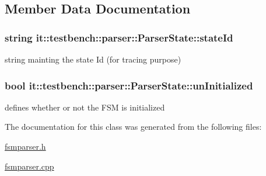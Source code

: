 \subsection{Member Data Documentation}
\hypertarget{classit_1_1testbench_1_1parser_1_1ParserState_a37ff06cea73b93936c08c364ceba28ca}{
\subsubsection[{state\-Id}]{\setlength{\rightskip}{0pt plus 5cm}string it\-::testbench\-::parser\-::\-Parser\-State\-::state\-Id\hspace{0.3cm}{\ttfamily [protected]}}}\label{db/d52/classit_1_1testbench_1_1parser_1_1ParserState_a37ff06cea73b93936c08c364ceba28ca}
string mainting the state Id (for tracing purpose) \hypertarget{classit_1_1testbench_1_1parser_1_1ParserState_a352a009cc8f93cd7a8936b8b806b76df}{
\subsubsection[{un\-Initialized}]{\setlength{\rightskip}{0pt plus 5cm}bool it\-::testbench\-::parser\-::\-Parser\-State\-::un\-Initialized\hspace{0.3cm}{\ttfamily [protected]}}}\label{db/d52/classit_1_1testbench_1_1parser_1_1ParserState_a352a009cc8f93cd7a8936b8b806b76df}
defines whether or not the F\-S\-M is initialized 

The documentation for this class was generated from the following files\-:\begin{DoxyCompactItemize}
\item 
\hyperlink{fsmparser_8h}{fsmparser.\-h}\item 
\hyperlink{fsmparser_8cpp}{fsmparser.\-cpp}\end{DoxyCompactItemize}
